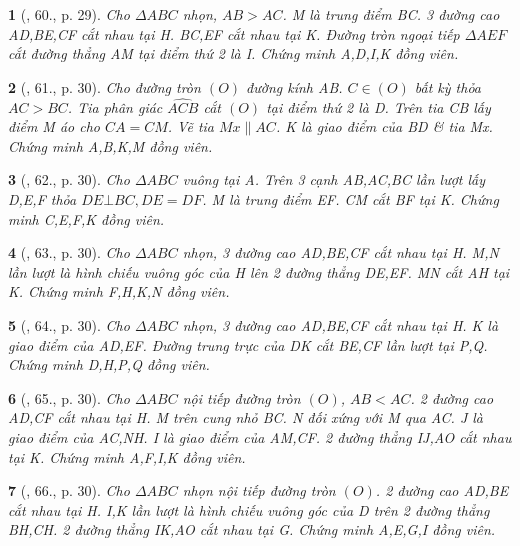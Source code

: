 \documentclass{article}
\newtheorem{baitoan}{}
\begin{document}
\begin{baitoan}[\cite{Thu_Chung_Viet_Minh_circ}, 60., p. 29]
	Cho $\Delta ABC$ nhọn, $AB > AC$. M là trung điểm BC. 3 đường cao AD,BE,CF cắt nhau tại H. BC,EF cắt nhau tại K. Đường tròn ngoại tiếp $\Delta AEF$ cắt đường thẳng AM tại điểm thứ 2 là I. Chứng minh A,D,I,K đồng viên.
\end{baitoan}

\begin{baitoan}[\cite{Thu_Chung_Viet_Minh_circ}, 61., p. 30]
	Cho đường tròn $(O)$ đường kính AB. $C\in(O)$ bất kỳ thỏa $AC > BC$. Tia phân giác $\widehat{ACB}$ cắt $(O)$ tại điểm thứ 2 là D. Trên tia CB lấy điểm M áo cho $CA = CM$. Vẽ tia $Mx\parallel AC$. K là giao điểm của BD \& tia Mx. Chứng minh A,B,K,M đồng viên.
\end{baitoan}

\begin{baitoan}[\cite{Thu_Chung_Viet_Minh_circ}, 62., p. 30]
	Cho $\Delta ABC$ vuông tại A. Trên 3 cạnh AB,AC,BC lần lượt lấy D,E,F thỏa $DE\bot BC,DE = DF$. M là trung điểm EF. CM cắt BF tại K. Chứng minh C,E,F,K đồng viên.
\end{baitoan}

\begin{baitoan}[\cite{Thu_Chung_Viet_Minh_circ}, 63., p. 30]
	Cho $\Delta ABC$ nhọn, 3 đường cao AD,BE,CF cắt nhau tại H. M,N lần lượt là hình chiếu vuông góc của H lên 2 đường thẳng DE,EF. MN cắt AH tại K. Chứng minh F,H,K,N đồng viên.
\end{baitoan}

\begin{baitoan}[\cite{Thu_Chung_Viet_Minh_circ}, 64., p. 30]
	Cho $\Delta ABC$ nhọn, 3 đường cao AD,BE,CF cắt nhau tại H. K là giao điểm của AD,EF. Đường trung trực của DK cắt BE,CF lần lượt tại P,Q. Chứng minh D,H,P,Q đồng viên.
\end{baitoan}

\begin{baitoan}[\cite{Thu_Chung_Viet_Minh_circ}, 65., p. 30]
	Cho $\Delta ABC$ nội tiếp đường tròn $(O)$, $AB < AC$. 2 đường cao AD,CF cắt nhau tại H. M trên cung nhỏ BC. N đối xứng với M qua AC. J là giao điểm của AC,NH. I là giao điểm của AM,CF. 2 đường thẳng IJ,AO cắt nhau tại K. Chứng minh A,F,I,K đồng viên.
\end{baitoan}

\begin{baitoan}[\cite{Thu_Chung_Viet_Minh_circ}, 66., p. 30]
	Cho $\Delta ABC$ nhọn nội tiếp đường tròn $(O)$. 2 đường cao AD,BE cắt nhau tại H. I,K lần lượt là hình chiếu vuông góc của D trên 2 đường thẳng BH,CH. 2 đường thẳng IK,AO cắt nhau tại G. Chứng minh A,E,G,I đồng viên.
\end{baitoan}
\end{document}
